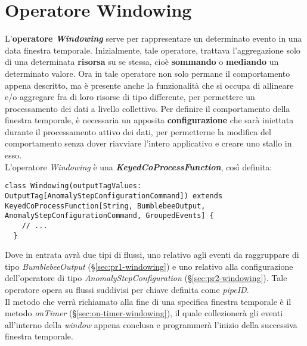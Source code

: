 \section{Operatore Windowing}
L'\textbf{operatore \textit{Windowing}} serve per rappresentare un determinato evento in una data finestra temporale. Inizialmente, tale operatore, trattava l'aggregazione solo di una determinata \textbf{risorsa} su se stessa, cioè \textbf{sommando} o \textbf{mediando} un determinato valore. Ora in tale operatore non solo permane il comportamento appena descritto, ma è presente anche la funzionalità che si occupa di allineare e/o aggregare fra di loro risorse di tipo differente, per permettere un processamento dei dati a livello collettivo. Per definire il comportamento della finestra temporale, è necessaria un apposita \textbf{configurazione} che sarà iniettata durante il processamento attivo dei dati, per permetterne la modifica del comportamento senza dover riavviare l'intero applicativo e creare uno stallo in esso.\\
L'operatore \textit{Windowing} è una \textbf{\textit{KeyedCoProcessFunction}}, così definita:
\begin{verbatim}
class Windowing(outputTagValues: OutputTag[AnomalyStepConfigurationCommand]) extends KeyedCoProcessFunction[String, BumblebeeOutput, AnomalyStepConfigurationCommand, GroupedEvents] {
	// ...
  }
\end{verbatim}
Dove in entrata avrà due tipi di flussi, uno relativo agli eventi da raggruppare di tipo \textit{BumblebeeOutput} (\S\ref{sec:pr1-windowing}) e uno relativo alla configurazione dell'operatore di tipo \textit{AnomalyStepConfiguration} (\S\ref{sec:pr2-windowing}). Tale operatore opera su flussi suddivisi per chiave definita come \textit{pipeID}.\\
Il metodo che verrà richiamato alla fine di una specifica finestra temporale è il metodo \textit{onTimer} (\S\ref{sec:on-timer-windowing}), il quale collezionerà gli eventi all'interno della \textit{window} appena conclusa e programmerà l'inizio della successiva finestra temporale.

